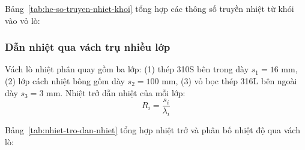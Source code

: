 \documentclass[../main.tex]{subfiles}
\begin{document}
Bảng~\ref{tab:he-so-truyen-nhiet-khoi} tổng hợp các thông số truyền nhiệt từ khói vào vỏ lò:
\begin{table}[htbp]
\centering
\caption{Tổng hợp hệ số truyền nhiệt từ khói buồng đốt vào vỏ lò}
\label{tab:he-so-truyen-nhiet-khoi}
\setlength{\tabcolsep}{4pt}
\end{table}

\subsubsection{Dẫn nhiệt qua vách trụ nhiều lớp}
\label{sec:dan-nhiet-vach-lo}

Vách lò nhiệt phân quay gồm ba lớp: (1) thép 310S bên trong dày $s_1 = 16$ mm, (2) lớp cách nhiệt bông gốm dày $s_2 = 100$ mm, (3) vỏ bọc thép 316L bên ngoài dày $s_3 = 3$ mm. Nhiệt trở dẫn nhiệt của mỗi lớp:
\begin{equation}
  R_i = \frac{s_i}{\lambda_i}
\end{equation}

Bảng~\ref{tab:nhiet-tro-dan-nhiet} tổng hợp nhiệt trở và phân bố nhiệt độ qua vách lò:
\begin{table}[htbp]
\centering
\caption{Tổng hợp nhiệt trở và phân bố nhiệt độ qua vách lò nhiệt phân quay}
\label{tab:nhiet-tro-dan-nhiet}
\setlength{\tabcolsep}{4pt}
\end{table}
\end{document}
